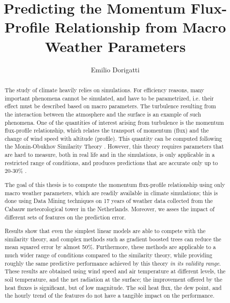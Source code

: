 \documentclass[a4paper,11pt]{kth-mag}
\title{Predicting the Momentum Flux-Profile Relationship from  Macro Weather Parameters}
\author{Emilio Dorigatti}
\begin{document}


\frontmatter
\pagestyle{empty}
\removepagenumbers
\maketitle
{}
\begin{abstract}
The study of climate heavily relies on simulations. For efficiency reasons, many important phenomena cannot be simulated, and have to be parametrized, i.e. their effect must be described based on macro parameters. The turbulence resulting from the interaction between the atmosphere and the surface is an example of such phenomena. One of the quantities of interest arising from turbulence is the momentum flux-profile relationship, which relates the transport of momentum (flux) and the change of wind speed with altitude (profile). This quantity can be computed following the Monin-Obukhov Similarity Theory \citep{mostayyyy}. However, this theory requires parameters that are hard to measure, both in real life and in the simulations, is only applicable in a restricted range of conditions, and produces predictions that are accurate only up to 20-30\% \citep{50years}.

The goal of this thesis is to compute the momentum flux-profile relationship using only macro weather parameters, which are readily available in climate simulations; this is done using Data Mining techniques on 17 years of weather data collected from the Cabauw meteorological tower in the Netherlands. Moreover, we asses the impact of different sets of features on the prediction error.

Results show that even the simplest linear models are able to compete with the similarity theory, and complex methods such as gradient boosted trees can reduce the mean squared error by almost 50\%. Furthermore, these methods are applicable to a much wider range of conditions compared to the similarity theory, while providing roughly the same predictive performance achieved by this theory \emph{in its validity range}. These results are obtained using wind speed and air temperature at different levels, the soil temperature, and the net radiation at the surface; the improvement offered by the heat fluxes is significant, but of low magnitude. The soil heat flux, the dew point, and the hourly trend of the features do not have a tangible impact on the performance.
\end{abstract}
\clearpage
\end{document}
